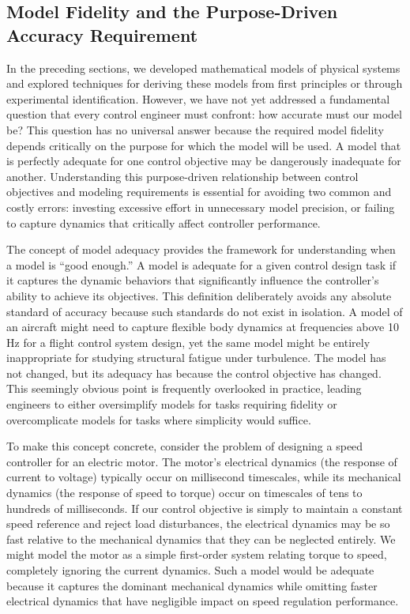 \subsection{Model Fidelity and the Purpose-Driven Accuracy Requirement}

In the preceding sections, we developed mathematical models of physical systems and explored techniques for deriving these models from first principles or through experimental identification. However, we have not yet addressed a fundamental question that every control engineer must confront: how accurate must our model be? This question has no universal answer because the required model fidelity depends critically on the purpose for which the model will be used. A model that is perfectly adequate for one control objective may be dangerously inadequate for another. Understanding this purpose-driven relationship between control objectives and modeling requirements is essential for avoiding two common and costly errors: investing excessive effort in unnecessary model precision, or failing to capture dynamics that critically affect controller performance.

The concept of model adequacy provides the framework for understanding when a model is ``good enough.'' A model is adequate for a given control design task if it captures the dynamic behaviors that significantly influence the controller's ability to achieve its objectives. This definition deliberately avoids any absolute standard of accuracy because such standards do not exist in isolation. A model of an aircraft might need to capture flexible body dynamics at frequencies above 10 Hz for a flight control system design, yet the same model might be entirely inappropriate for studying structural fatigue under turbulence. The model has not changed, but its adequacy has because the control objective has changed. This seemingly obvious point is frequently overlooked in practice, leading engineers to either oversimplify models for tasks requiring fidelity or overcomplicate models for tasks where simplicity would suffice.

To make this concept concrete, consider the problem of designing a speed controller for an electric motor. The motor's electrical dynamics (the response of current to voltage) typically occur on millisecond timescales, while its mechanical dynamics (the response of speed to torque) occur on timescales of tens to hundreds of milliseconds. If our control objective is simply to maintain a constant speed reference and reject load disturbances, the electrical dynamics may be so fast relative to the mechanical dynamics that they can be neglected entirely. We might model the motor as a simple first-order system relating torque to speed, completely ignoring the current dynamics. Such a model would be adequate because it captures the dominant mechanical dynamics while omitting faster electrical dynamics that have negligible impact on speed regulation performance.

